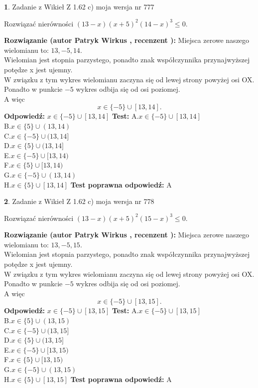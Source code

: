 \documentclass[12pt, a4paper]{article}
\theoremstyle{definition} %
\newtheorem{zad}{}
\newcommand{\zadStart}[1]{\begin{zad}#1\newline}
\newcommand{\zadStop}{\end{zad}}
\newcommand{\rozwStart}[2]{\noindent \textbf{Rozwiązanie (autor #1 , recenzent #2): }\newline}
\newcommand{\rozwStop}{\newline}
\newcommand{\odpStart}{\noindent \textbf{Odpowiedź:}\newline}
\newcommand{\odpStop}{\newline}
\newcommand{\testStart}{\noindent \textbf{Test:}\newline}
\newcommand{\testStop}{\newline}
\newcommand{\kluczStart}{\noindent \textbf{Test poprawna odpowiedź:}\newline}
\newcommand{\kluczStop}{\newline}
\begin{document}
\zadStart{Zadanie z Wikieł Z 1.62 c) moja wersja nr 777}

Rozwiązać nierówności $(13-x)(x+5)^{2}(14-x)^{3}\le0$.
\zadStop
\rozwStart{Patryk Wirkus}{}
Miejsca zerowe naszego wielomianu to: $13, -5, 14$.\\
Wielomian jest stopnia parzystego, ponadto znak współczynnika przy\linebreak najwyższej potędze x jest ujemny.\\ W związku z tym wykres wielomianu zaczyna się od lewej strony powyżej osi OX.\\
Ponadto w punkcie $-5$ wykres odbija się od osi poziomej.\\
A więc $$x \in \{-5\} \cup [13,14].$$
\rozwStop
\odpStart
$x \in \{-5\} \cup [13,14]$
\odpStop
\testStart
A.$x \in \{-5\} \cup [13,14]$\\
B.$x \in \{5\} \cup (13,14)$\\
C.$x \in \{-5\} \cup (13,14]$\\
D.$x \in \{5\} \cup (13,14]$\\
E.$x \in \{-5\} \cup [13,14)$\\
F.$x \in \{5\} \cup [13,14)$\\
G.$x \in \{-5\} \cup (13,14)$\\
H.$x \in \{5\} \cup [13,14]$
\testStop
\kluczStart
A
\kluczStop



\zadStart{Zadanie z Wikieł Z 1.62 c) moja wersja nr 778}

Rozwiązać nierówności $(13-x)(x+5)^{2}(15-x)^{3}\le0$.
\zadStop
\rozwStart{Patryk Wirkus}{}
Miejsca zerowe naszego wielomianu to: $13, -5, 15$.\\
Wielomian jest stopnia parzystego, ponadto znak współczynnika przy\linebreak najwyższej potędze x jest ujemny.\\ W związku z tym wykres wielomianu zaczyna się od lewej strony powyżej osi OX.\\
Ponadto w punkcie $-5$ wykres odbija się od osi poziomej.\\
A więc $$x \in \{-5\} \cup [13,15].$$
\rozwStop
\odpStart
$x \in \{-5\} \cup [13,15]$
\odpStop
\testStart
A.$x \in \{-5\} \cup [13,15]$\\
B.$x \in \{5\} \cup (13,15)$\\
C.$x \in \{-5\} \cup (13,15]$\\
D.$x \in \{5\} \cup (13,15]$\\
E.$x \in \{-5\} \cup [13,15)$\\
F.$x \in \{5\} \cup [13,15)$\\
G.$x \in \{-5\} \cup (13,15)$\\
H.$x \in \{5\} \cup [13,15]$
\testStop
\kluczStart
A
\kluczStop
\end{document}
